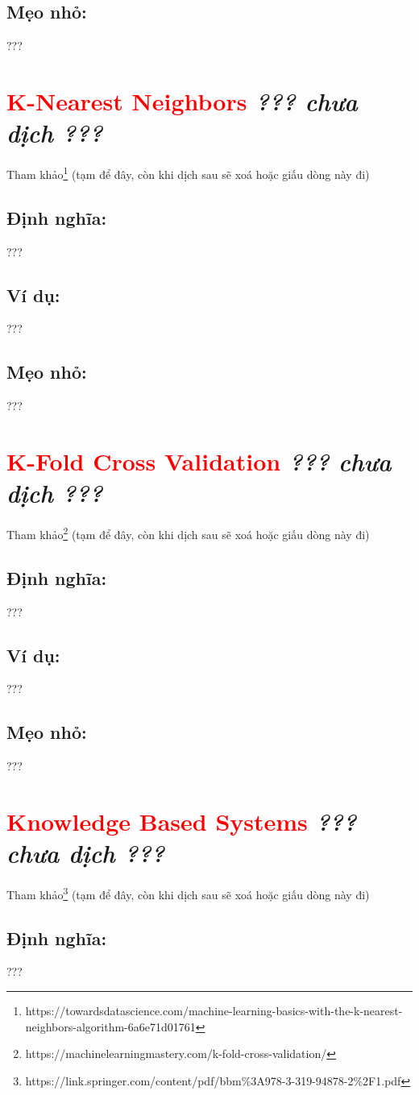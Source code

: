 \subsection*{Mẹo nhỏ:}
???
\section*{\huge \textcolor{Red}{K-Nearest Neighbors}  \small \textit{??? chưa dịch ???} }
Tham khảo\footnote{https://towardsdatascience.com/machine-learning-basics-with-the-k-nearest-neighbors-algorithm-6a6e71d01761} (tạm để đây, còn khi dịch sau sẽ xoá hoặc giấu dòng này đi)
\subsection*{Định nghĩa:}
???
\subsection*{Ví dụ:}
???
\subsection*{Mẹo nhỏ:}
???
\section*{\huge \textcolor{Red}{K-Fold Cross Validation}  \small \textit{??? chưa dịch ???} }
Tham khảo\footnote{https://machinelearningmastery.com/k-fold-cross-validation/} (tạm để đây, còn khi dịch sau sẽ xoá hoặc giấu dòng này đi)
\subsection*{Định nghĩa:}
???
\subsection*{Ví dụ:}
???
\subsection*{Mẹo nhỏ:}
???
\section*{\huge \textcolor{Red}{Knowledge Based Systems}  \small \textit{??? chưa dịch ???} }
Tham khảo\footnote{https://link.springer.com/content/pdf/bbm\%3A978-3-319-94878-2\%2F1.pdf} (tạm để đây, còn khi dịch sau sẽ xoá hoặc giấu dòng này đi)
\subsection*{Định nghĩa:}
???
